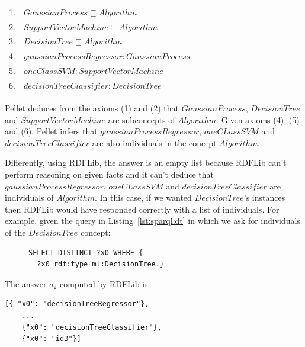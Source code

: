 \documentclass[12pt,a4paper,twoside]{report}
\begin{document}
\vspace*{0.3cm}
\begin{tabular}{ll}
1. & $GaussianProcess  \sqsubseteq Algorithm$\\
2. & $SupportVectorMachine  \sqsubseteq Algorithm$\\
3. & $DecisionTree  \sqsubseteq Algorithm$\\
4. & $gaussianProcessRegressor: GaussianProcess$\\
5. & $oneClassSVM: SupportVectorMachine$\\
6. & $decisionTreeClassifier: DecisionTree$\\
\end{tabular}
\vspace*{0.3cm}

Pellet deduces from the axioms (1) and (2) that $GaussianProcess$, $DecisionTree$ and $SupportVectorMachine$ are subconcepts of $Algorithm$. Given axioms (4), (5) and (6), Pellet infers that $gaussianProcessRegressor$, $oneCLassSVM$ and $decisionTreeClassifier$ are also individuals in the concept $Algorithm$. 

Differently, using RDFLib, the answer is an empty list because RDFLib can't perform reasoning on given facts and it can't deduce that $gaussianProcessRegressor$, $oneCLassSVM$ and $decisionTreeClassifier$ are  individuals of $Algorithm$. 
In this case, if we wanted $DecisionTree$'s instances then RDFLib would have responded correctly with a list of individuals. 
For example, given the query in Listing~\ref{lst:sparql:dt} in which we ask for individuals of the $DecisionTree$ concept:


\begin{figure}[h]
\begin{footnotesize}
\begin{lstlisting}[captionpos=b, caption=SPARQL query for obtaining the instances of the DecisionTree concept., label=lst:sparql:dt,
   basicstyle=\ttfamily,frame=single]
SELECT DISTINCT ?x0 WHERE {
  ?x0 rdf:type ml:DecisionTree.}
\end{lstlisting}
\end{footnotesize}
\end{figure}

The answer $a_2$ computed by RDFLib is:

\begin{center}
\begin{lstlisting}[basicstyle=\footnotesize]
    [{ "x0": "decisionTreeRegressor"}, 
    ...
    {"x0": "decisionTreeClassifier"}, 
    {"x0": "id3"}]
\end{lstlisting}
\end{center}
\end{document}
